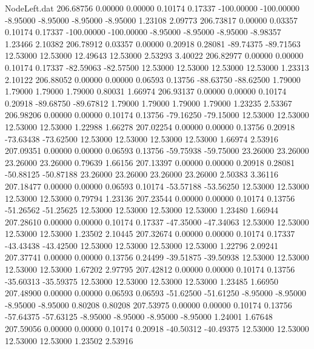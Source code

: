 \begin{filecontents}{NodeLeft.dat}
 206.68756    0.00000    0.00000     0.10174    0.17337 -100.00000 -100.00000   -8.95000   -8.95000   -8.95000   -8.95000    1.23108    2.09773
 206.73817    0.00000    0.03357     0.10174    0.17337 -100.00000 -100.00000   -8.95000   -8.95000   -8.95000   -8.98357    1.23466    2.10382
 206.78912    0.03357    0.00000     0.20918    0.28081  -89.74375  -89.71563   12.53000   12.53000   12.49643   12.53000    2.53293    3.40022
 206.82977    0.00000    0.00000     0.10174    0.17337  -82.59063  -82.57500   12.53000   12.53000   12.53000   12.53000    1.23313    2.10122
 206.88052    0.00000    0.00000     0.06593    0.13756  -88.63750  -88.62500    1.79000    1.79000    1.79000    1.79000    0.80031    1.66974
 206.93137    0.00000    0.00000     0.10174    0.20918  -89.68750  -89.67812    1.79000    1.79000    1.79000    1.79000    1.23235    2.53367
 206.98206    0.00000    0.00000     0.10174    0.13756  -79.16250  -79.15000   12.53000   12.53000   12.53000   12.53000    1.22988    1.66278
 207.02254    0.00000    0.00000     0.13756    0.20918  -73.63438  -73.62500   12.53000   12.53000   12.53000   12.53000    1.66974    2.53916
 207.09351    0.00000    0.00000     0.06593    0.13756  -59.75938  -59.75000   23.26000   23.26000   23.26000   23.26000    0.79639    1.66156
 207.13397    0.00000    0.00000     0.20918    0.28081  -50.88125  -50.87188   23.26000   23.26000   23.26000   23.26000    2.50383    3.36116
 207.18477    0.00000    0.00000     0.06593    0.10174  -53.57188  -53.56250   12.53000   12.53000   12.53000   12.53000    0.79794    1.23136
 207.23544    0.00000    0.00000     0.10174    0.13756  -51.26562  -51.25625   12.53000   12.53000   12.53000   12.53000    1.23480    1.66944
 207.28610    0.00000    0.00000     0.10174    0.17337  -47.35000  -47.34063   12.53000   12.53000   12.53000   12.53000    1.23502    2.10445
 207.32674    0.00000    0.00000     0.10174    0.17337  -43.43438  -43.42500   12.53000   12.53000   12.53000   12.53000    1.22796    2.09241
 207.37741    0.00000    0.00000     0.13756    0.24499  -39.51875  -39.50938   12.53000   12.53000   12.53000   12.53000    1.67202    2.97795
 207.42812    0.00000    0.00000     0.10174    0.13756  -35.60313  -35.59375   12.53000   12.53000   12.53000   12.53000    1.23485    1.66950
 207.48900    0.00000    0.00000     0.06593    0.06593  -51.62500  -51.61250   -8.95000   -8.95000   -8.95000   -8.95000    0.80208    0.80208
 207.53975    0.00000    0.00000     0.10174    0.13756  -57.64375  -57.63125   -8.95000   -8.95000   -8.95000   -8.95000    1.24001    1.67648
 207.59056    0.00000    0.00000     0.10174    0.20918  -40.50312  -40.49375   12.53000   12.53000   12.53000   12.53000    1.23502    2.53916

\end{filecontents}
